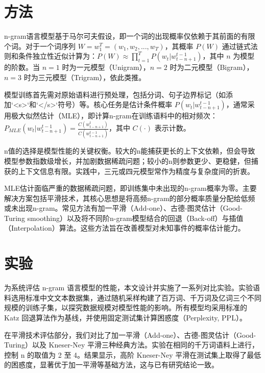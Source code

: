 \documentclass[10pt,a4paper,twocolumn]{article}
\begin{document}
\section{ 方法 }
n-gram语言模型基于马尔可夫假设，即一个词的出现概率仅依赖于其前面的有限个词。对于一个词序列 \( W = w_1^T = (w_1, w_2, ..., w_T) \)，其概率 \( P(W) \) 通过链式法则和条件独立性近似计算为：\( P(W) \approx \prod_{t=1}^{T} P(w_t | w_{t-n+1}^{t-1}) \)，其中 \( n \) 为模型的阶数\cite{anonndchen1996empirical}。当 \( n=1 \) 时为一元模型（Unigram），\( n=2 \) 时为二元模型（Bigram），\( n=3 \) 时为三元模型（Trigram），依此类推。

模型训练首先需对原始语料进行预处理，包括分词、句子边界标记（如添加`<s>`和`</s>`符号）等。核心任务是估计条件概率 \( P(w_t | w_{t-n+1}^{t-1}) \)，通常采用极大似然估计（MLE），即计算n-gram在训练语料中的相对频次：\( P_{MLE}(w_t | w_{t-n+1}^{t-1}) = \frac{C(w_{t-n+1}^{t})}{C(w_{t-n+1}^{t-1})} \)，其中 \( C(\cdot) \) 表示计数\cite{anonndjurafsky2023speech}。

n值的选择是模型性能的关键权衡。较大的n能捕获更长的上下文依赖，但会导致模型参数指数级增长，并加剧数据稀疏问题；较小的n则参数更少、更稳健，但捕获的上下文信息有限。实践中，三元或四元模型常作为精度与复杂度间的折衷\cite{anonndgoodman2001bit}。

MLE估计面临严重的数据稀疏问题，即训练集中未出现的n-gram概率为零。主要解决方案包括平滑技术，其核心思想是将高频n-gram的部分概率质量分配给低频或未出现n-gram。常见方法有加一平滑（Add-one）、古德-图灵估计（Good-Turing smoothing）以及将不同阶n-gram模型结合的回退（Back-off）与插值（Interpolation）算法\cite{anonndchen1996empirical}。这些方法旨在改善模型对未知事件的概率估计能力。


\section{ 实验 }
为系统评估 n-gram 语言模型的性能，本文设计并实施了一系列对比实验。实验语料选用标准中文文本数据集，通过随机采样构建了百万词、千万词及亿词三个不同规模的训练子集，以探究数据规模对模型性能的影响。所有模型均采用标准的 Katz 回退算法作为基线，并使用固定测试集计算困惑度（Perplexity, PPL）\cite{anonndchen1996empirical}。

在平滑技术评估部分，我们对比了加一平滑（Add-one）、古德-图灵估计（Good-Turing）以及 Kneser-Ney 平滑三种经典方法。实验在相同的千万词语料上进行，控制 n 的取值为 2 至 4。结果显示，高阶 Kneser-Ney 平滑在测试集上取得了最低的困惑度，显著优于加一平滑等基础方法，这与已有研究结论一致\cite{anonndkneser1995improved}。
\end{document}
